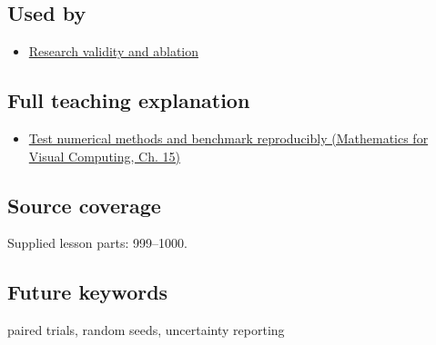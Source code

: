 \subsection{Used by}\label{appendix-b9db93e28371-used-by}

\begin{itemize}
\tightlist
\item
  \hyperref[appendix-65788587ef78]{Research validity and ablation}
\end{itemize}

\subsection{Full teaching explanation}\label{appendix-b9db93e28371-full-teaching-explanation}

\begin{itemize}
\tightlist
\item
  \href{../02-Mathematics-for-Visual-Computing/main.pdf\#nameddest=02-foundations-ii-ch031-test-numerical-methods-and-benchmark-reproducibly}{Test numerical methods and benchmark reproducibly (Mathematics for Visual Computing, Ch. 15)}
\end{itemize}

\subsection{Source coverage}\label{appendix-b9db93e28371-source-coverage}

Supplied lesson parts: 999--1000.

\subsection{Future keywords}\label{appendix-b9db93e28371-future-keywords}

paired trials, random seeds, uncertainty reporting
